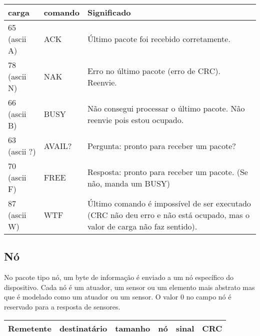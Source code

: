 \documentclass[11pt,	 papera4]{article}
\begin{document}
\begin{center}
\begin{tabular}{p{2cm}p{1.5cm}p{12cm}}
 carga         &  comando  &  Significado                                                                                                                \\
\hline
 65 (ascii A)  &  ACK      &  Último pacote foi recebido corretamente.                                                                                   \\
 78 (ascii N)  &  NAK      &  Erro no último pacote (erro de CRC). Reenvie.                                                                              \\
 66 (ascii B)  &  BUSY     &  Não consegui processar o último pacote. Não reenvie pois estou ocupado.                                                    \\
 63 (ascii ?)  &  AVAIL?   &  Pergunta: pronto para receber um pacote?                                                                                  \\
 70 (ascii F)  &  FREE     &  Resposta: pronto para receber um pacote. (Se não, manda um BUSY)                                                           \\
 87 (ascii W)  &  WTF      &  Último comando é impossível de ser executado (CRC não deu erro e não está ocupado, mas o valor de carga não faz sentido).  \\
\hline
\end{tabular}
\end{center}



\subsection{Nó}
\label{sec-1.2}


No pacote tipo nó, um byte de informação é enviado a um nó específico do dispositivo. Cada nó é um atuador, um sensor ou um elemento mais abstrato mas que é modelado como um atuador ou um sensor. O valor 0 no campo nó é reservado para a resposta de sensores.


\begin{center}
\begin{tabular}{llllll}
\hline
 Remetente  &  destinatário  &  tamanho  &  nó  &  sinal  &  CRC  \\
\hline
\end{tabular}
\end{center}
\end{document}
